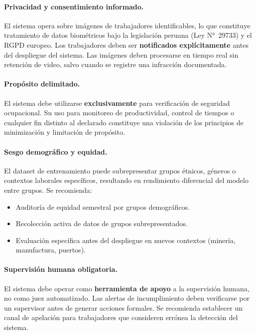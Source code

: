 \documentclass{article}
\begin{document}
\paragraph{Privacidad y consentimiento informado.}
El sistema opera sobre imágenes de trabajadores identificables, lo que
constituye tratamiento de datos biométricos bajo la legislación peruana
(Ley N°~29733) y el RGPD europeo. Los trabajadores deben ser
\textbf{notificados explícitamente} antes del despliegue del sistema.
Las imágenes deben procesarse en tiempo real sin retención de video,
salvo cuando se registre una infracción documentada.

\paragraph{Propósito delimitado.}
El sistema debe utilizarse \textbf{exclusivamente} para verificación de
seguridad ocupacional. Su uso para monitoreo de productividad, control
de tiempos o cualquier fin distinto al declarado constituye una violación
de los principios de minimización y limitación de propósito.

\paragraph{Sesgo demográfico y equidad.}
El dataset de entrenamiento puede subrepresentar grupos étnicos,
géneros o contextos laborales específicos, resultando en rendimiento
diferencial del modelo entre grupos. Se recomienda:
\begin{itemize}[itemsep=2pt]
  \item Auditoría de equidad semestral por grupos demográficos.
  \item Recolección activa de datos de grupos subrepresentados.
  \item Evaluación específica antes del despliegue en nuevos
        contextos (minería, manufactura, puertos).
\end{itemize}

\paragraph{Supervisión humana obligatoria.}
El sistema debe operar como \textbf{herramienta de apoyo} a la
supervisión humana, no como juez automatizado. Las alertas de
incumplimiento deben verificarse por un supervisor antes de generar
acciones formales. Se recomienda establecer un canal de apelación
para trabajadores que consideren errónea la detección del sistema.
\end{document}
